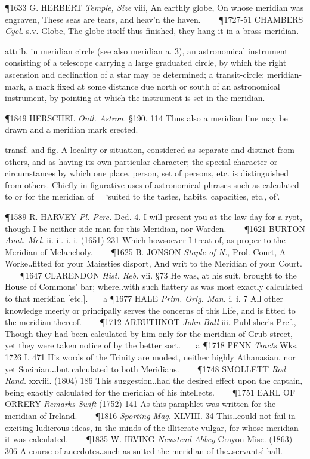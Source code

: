 \begin{description}[wide, labelwidth=!, labelindent=0pt]
\begin{myenumerate}
\P 1633 G. HERBERT  \textit{Temple, Size} viii, An earthly globe, On whose meridian was engraven, These seas are tears, and heav'n the haven.    
\P 1727-51 CHAMBERS  \textit{Cycl.} s.v. Globe, The globe itself thus finished, they hang it in a brass meridian.

 attrib. in meridian circle (see also meridian a. 3), an astronomical instrument consisting of a telescope carrying a large graduated circle, by which the right ascension and declination of a star may be determined; a transit-circle; meridian-mark, a mark fixed at some distance due north or south of an astronomical instrument, by pointing at which the instrument is set in the meridian.

\P 1849 HERSCHEL  \textit{Outl. Astron.} §190. 114 Thus also a meridian line may be drawn and a meridian mark erected.

 transf. and fig. A locality or situation, considered as separate and distinct from others, and as having its own particular character; the special character or circumstances by which one place, person, set of persons, etc. is distinguished from others. Chiefly in figurative uses of astronomical phrases such as calculated to or for the meridian of = ‘suited to the tastes, habits, capacities, etc., of’.

\P 1589 R. HARVEY  \textit{Pl. Perc.} Ded. 4. I will present you at the law day for a ryot, though I be neither side man for this Meridian, nor Warden.    
\P 1621 BURTON  \textit{Anat. Mel.} ii. ii. i. i. (1651) 231 Which howsoever I treat of, as proper to the Meridian of Melancholy.    
\P 1625 B. JONSON  \textit{Staple of N.}, Prol. Court, A Worke‥fitted for your Maiesties disport, And writ to the Meridian of your Court.    
\P 1647 CLARENDON  \textit{Hist. Reb.} vii. §73 He was, at his suit, brought to the House of Commons' bar; where‥with such flattery as was most exactly calculated to that meridian [etc.].    a 
\P 1677 HALE  \textit{Prim. Orig. Man.} i. i. 7 All other knowledge meerly or principally serves the concerns of this Life, and is fitted to the meridian thereof.    
\P 1712 ARBUTHNOT  \textit{John Bull} iii. Publisher's Pref., Though they had been calculated by him only for the meridian of Grub-street, yet they were taken notice of by the better sort.    a 
\P 1718 PENN \textit{Tracts} Wks. 1726 I. 471  His words of the Trinity are modest, neither highly Athanasian, nor yet Socinian,‥but calculated to both Meridians.    
\P 1748 SMOLLETT  \textit{Rod Rand.} xxviii. (1804) 186 This suggestion‥had the desired effect upon the captain, being exactly calculated for the meridian of his intellects.    
\P 1751 EARL OF ORRERY  \textit{Remarks Swift} (1752) 141 As this pamphlet was written for the meridian of Ireland.    
\P 1816 \textit{Sporting  Mag.} XLVIII. 34 This‥could not fail in exciting ludicrous ideas, in the minds of the illiterate vulgar, for whose meridian it was calculated.    
\P 1835 W. IRVING  \textit{Newstead Abbey} Crayon Misc. (1863) 306 A course of anecdotes‥such as suited the meridian of the‥servants' hall.






\end{myenumerate}
\end{description}
